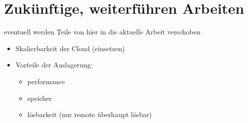 \documentclass[a4paper,10pt]{article}
\begin{document}
\newpage

\section{Zukünftige, weiterführen Arbeiten}

eventuell werden Teile von hier in die aktuelle Arbeit verschoben

\begin{itemize}
 \item Skalierbarkeit der Cloud (einsetzen)
 \item Vorteile der Auslagerung:
  \begin{itemize}
    \item performance
    \item speicher
    \item lösbarkeit (nur remote überhaupt lösbar)
  \end{itemize}

\end{itemize}
\end{document}
